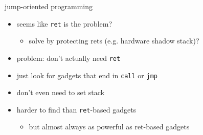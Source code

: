 
\begin{frame}{jump-oriented programming}
    \begin{itemize}
        \item seems like \texttt{ret} is the problem?
            \begin{itemize}
            \item solve by protecting rets (e.g. hardware shadow stack)?
            \end{itemize}
        \item problem: don't actually need \texttt{ret}
        \vspace{.5cm}
        \item<2-> just look for gadgets that end in \texttt{call} or \texttt{jmp}
        \item<2-> don't even need to set stack
        \item<2-> harder to find than \texttt{ret}-based gadgets
            \begin{itemize}
            \item but almost always as powerful as ret-based gadgets
            \end{itemize}
    \end{itemize}
\end{frame}

